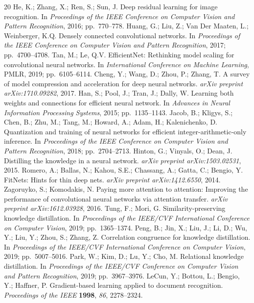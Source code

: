 \documentclass[symmetry,article,submit,pdftex,moreauthors]{Definitions/mdpi}
\begin{document}
\begin{thebibliography}{20}
 He, K.; Zhang, X.; Ren, S.; Sun, J. Deep residual learning for image recognition. In \textit{Proceedings of the IEEE Conference on Computer Vision and Pattern Recognition}, 2016; pp.~770--778.
 Huang, G.; Liu, Z.; Van Der Maaten, L.; Weinberger, K.Q. Densely connected convolutional networks. In \textit{Proceedings of the IEEE Conference on Computer Vision and Pattern Recognition}, 2017; pp.~4700--4708.
 Tan, M.; Le, Q.V. EfficientNet: Rethinking model scaling for convolutional neural networks. In \textit{International Conference on Machine Learning}, PMLR, 2019; pp.~6105--6114.
 Cheng, Y.; Wang, D.; Zhou, P.; Zhang, T. A survey of model compression and acceleration for deep neural networks. \textit{arXiv preprint arXiv:1710.09282}, 2017.
 Han, S.; Pool, J.; Tran, J.; Dally, W. Learning both weights and connections for efficient neural network. In \textit{Advances in Neural Information Processing Systems}, 2015; pp.~1135--1143.
 Jacob, B.; Kligys, S.; Chen, B.; Zhu, M.; Tang, M.; Howard, A.; Adam, H.; Kalenichenko, D. Quantization and training of neural networks for efficient integer-arithmetic-only inference. In \textit{Proceedings of the IEEE Conference on Computer Vision and Pattern Recognition}, 2018; pp.~2704--2713.
 Hinton, G.; Vinyals, O.; Dean, J. Distilling the knowledge in a neural network. \textit{arXiv preprint arXiv:1503.02531}, 2015.
 Romero, A.; Ballas, N.; Kahou, S.E.; Chassang, A.; Gatta, C.; Bengio, Y. FitNets: Hints for thin deep nets. \textit{arXiv preprint arXiv:1412.6550}, 2014.
 Zagoruyko, S.; Komodakis, N. Paying more attention to attention: Improving the performance of convolutional neural networks via attention transfer. \textit{arXiv preprint arXiv:1612.03928}, 2016.
 Tung, F.; Mori, G. Similarity-preserving knowledge distillation. In \textit{Proceedings of the IEEE/CVF International Conference on Computer Vision}, 2019; pp.~1365--1374.
 Peng, B.; Jin, X.; Liu, J.; Li, D.; Wu, Y.; Liu, Y.; Zhou, S.; Zhang, Z. Correlation congruence for knowledge distillation. In \textit{Proceedings of the IEEE/CVF International Conference on Computer Vision}, 2019; pp.~5007--5016.
 Park, W.; Kim, D.; Lu, Y.; Cho, M. Relational knowledge distillation. In \textit{Proceedings of the IEEE/CVF Conference on Computer Vision and Pattern Recognition}, 2019; pp.~3967--3976.
 LeCun, Y.; Bottou, L.; Bengio, Y.; Haffner, P. Gradient-based learning applied to document recognition. \textit{Proceedings of the IEEE} \textbf{1998}, \textit{86}, 2278--2324.

\end{thebibliography}
\end{document}
